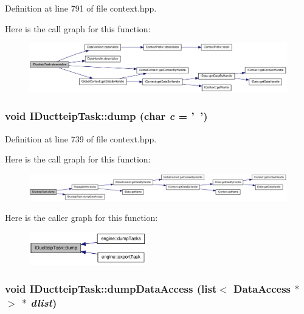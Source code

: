 Definition at line 791 of file context.hpp.

Here is the call graph for this function:\nopagebreak
\begin{figure}[H]
\begin{center}
\leavevmode
\includegraphics[width=420pt]{class_i_ductteip_task_a035d61635b69e2682c7361e3a07f610e_cgraph}
\end{center}
\end{figure}
\hypertarget{class_i_ductteip_task_aa9fae61a11236066513118d19ebd22b0}{
\subsubsection[{dump}]{\setlength{\rightskip}{0pt plus 5cm}void IDuctteipTask::dump (char {\em c} = {\ttfamily '~'})}}
\label{class_i_ductteip_task_aa9fae61a11236066513118d19ebd22b0}


Definition at line 739 of file context.hpp.

Here is the call graph for this function:\nopagebreak
\begin{figure}[H]
\begin{center}
\leavevmode
\includegraphics[width=420pt]{class_i_ductteip_task_aa9fae61a11236066513118d19ebd22b0_cgraph}
\end{center}
\end{figure}


Here is the caller graph for this function:\nopagebreak
\begin{figure}[H]
\begin{center}
\leavevmode
\includegraphics[width=145pt]{class_i_ductteip_task_aa9fae61a11236066513118d19ebd22b0_icgraph}
\end{center}
\end{figure}
\hypertarget{class_i_ductteip_task_ab3ea4b7cc3e270b83a4b75655b4efa57}{
\subsubsection[{dumpDataAccess}]{\setlength{\rightskip}{0pt plus 5cm}void IDuctteipTask::dumpDataAccess (list$<$ {\bf DataAccess} $\ast$ $>$ $\ast$ {\em dlist})}}
\label{class_i_ductteip_task_ab3ea4b7cc3e270b83a4b75655b4efa57}


